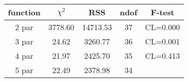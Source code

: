 \begin{tabular}{c|c|c|c|c}
function & $\chi^2$ & RSS & ndof & F-test \\
\hline
2 par & 3778.60 & 14713.53 & 37 & CL=0.000 \\
3 par & 24.62 & 3260.77 & 36 & CL=0.001 \\
4 par & 21.97 & 2425.70 & 35 & CL=0.413 \\
5 par & 22.49 & 2378.98 & 34 & \\
\hline
\end{tabular}
